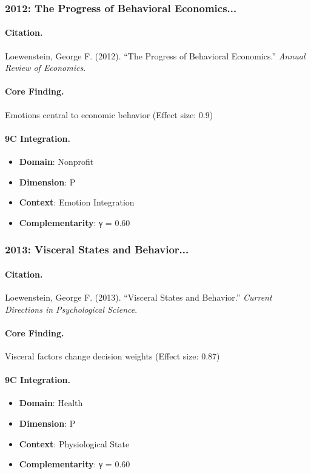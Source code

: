 \subsubsection{2012: The Progress of Behavioral Economics...}

\paragraph{Citation.}
Loewenstein, George F. (2012). ``The Progress of Behavioral Economics.''
\textit{Annual Review of Economics}.

\paragraph{Core Finding.}
Emotions central to economic behavior (Effect size: 0.9)

\paragraph{9C Integration.}
\begin{itemize}[nosep]
  \item \textbf{Domain}: Nonprofit
  \item \textbf{Dimension}: P
  \item \textbf{Context}: Emotion Integration
  \item \textbf{Complementarity}: γ = 0.60
\end{itemize}

\subsubsection{2013: Visceral States and Behavior...}

\paragraph{Citation.}
Loewenstein, George F. (2013). ``Visceral States and Behavior.''
\textit{Current Directions in Psychological Science}.

\paragraph{Core Finding.}
Visceral factors change decision weights (Effect size: 0.87)

\paragraph{9C Integration.}
\begin{itemize}[nosep]
  \item \textbf{Domain}: Health
  \item \textbf{Dimension}: P
  \item \textbf{Context}: Physiological State
  \item \textbf{Complementarity}: γ = 0.60
\end{itemize}

